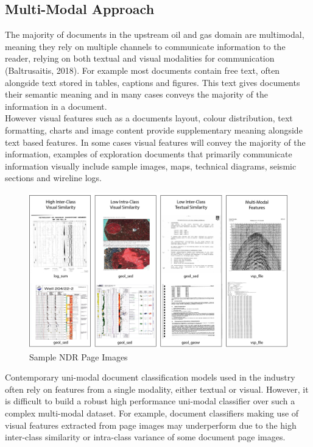 \documentclass[a4paper,12pt]{article}
\begin{document}
\subsection{Multi-Modal Approach}

The majority of documents in the upstream oil and gas domain are multimodal, meaning they rely on multiple channels to communicate information to the reader, relying on both textual and visual modalities for communication (Baltrusaitis, 2018). For example most documents contain free text, often alongside text stored in tables, captions and figures. This text gives documents their semantic meaning and in many cases conveys the majority of the information in a document.\\

However visual features such as a documents layout, colour distribution, text formatting, charts and image content provide supplementary meaning alongside text based features. In some cases visual features will convey the majority of the information, examples of exploration documents that primarily communicate information visually include sample images, maps, technical diagrams, seismic sections and wireline logs.\\

\begin{figure}[H]
\caption{Sample NDR Page Images}
\includegraphics[scale=0.48]{page_samples.png}
\centering
\end{figure}

Contemporary uni-modal document classification models used in the industry often rely on features from a single modality, either textual or visual. However, it is difficult to build a robust high performance uni-modal classifier over such a complex multi-modal dataset. For example, document classifiers making use of visual features extracted from page images may underperform due to the high inter-class similarity or intra-class variance of some document page images.\\
\end{document}
